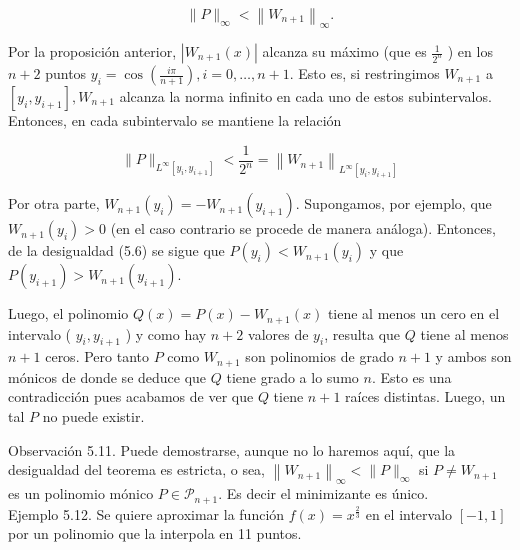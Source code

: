 \documentclass[10pt]{book}
\begin{document}
$$
\|P\|_{\infty}<\left\|W_{n+1}\right\|_{\infty} .
$$

Por la proposición anterior, $\left|W_{n+1}(x)\right|$ alcanza su máximo (que es $\frac{1}{2^{n}}$ ) en los $n+2$ puntos $y_{i}=\cos \left(\frac{i \pi}{n+1}\right), i=0, \ldots, n+1$. Esto es, si restringimos $W_{n+1}$ a $\left[y_{i}, y_{i+1}\right], W_{n+1}$ alcanza la norma infinito en cada uno de estos subintervalos. Entonces, en cada subintervalo se mantiene la relación


\begin{equation*}
\|P\|_{L^{\infty}\left[y_{i}, y_{i+1}\right]}<\frac{1}{2^{n}}=\left\|W_{n+1}\right\|_{L^{\infty}\left[y_{i}, y_{i+1}\right]} \tag{5.6}
\end{equation*}


Por otra parte, $W_{n+1}\left(y_{i}\right)=-W_{n+1}\left(y_{i+1}\right)$. Supongamos, por ejemplo, que $W_{n+1}\left(y_{i}\right)>0$ (en el caso contrario se procede de manera análoga). Entonces, de la desigualdad (5.6) se sigue que $P\left(y_{i}\right)<W_{n+1}\left(y_{i}\right)$ y que $P\left(y_{i+1}\right)>W_{n+1}\left(y_{i+1}\right)$.

Luego, el polinomio $Q(x)=P(x)-W_{n+1}(x)$ tiene al menos un cero en el intervalo ( $y_{i}, y_{i+1}$ ) y como hay $n+2$ valores de $y_{i}$, resulta que $Q$ tiene al menos $n+1$ ceros. Pero tanto $P$ como $W_{n+1}$ son polinomios de grado $n+1$ y ambos son mónicos de donde se deduce que $Q$ tiene grado a lo sumo $n$. Esto es una contradicción pues acabamos de ver que $Q$ tiene $n+1$ raíces distintas. Luego, un tal $P$ no puede existir.

Observación 5.11. Puede demostrarse, aunque no lo haremos aquí, que la desigualdad del teorema es estricta, o sea, $\left\|W_{n+1}\right\|_{\infty}<\|P\|_{\infty}$ si $P \neq W_{n+1}$ es un polinomio mónico $P \in \mathcal{P}_{n+1}$. Es decir el minimizante es único.\\
Ejemplo 5.12. Se quiere aproximar la función $f(x)=x^{\frac{2}{3}}$ en el intervalo $[-1,1]$ por un polinomio que la interpola en 11 puntos.
\end{document}
